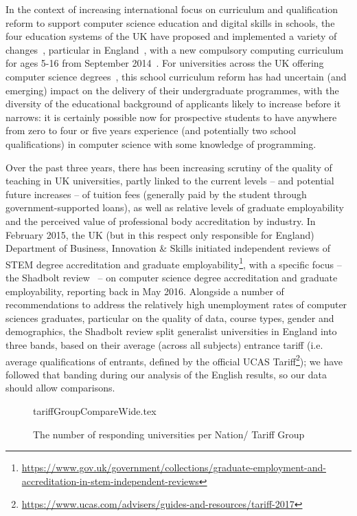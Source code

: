 \documentclass[english,submission]{programming}
\begin{document}
In the context of increasing international focus on curriculum and
qualification reform to support computer science education and digital
skills in schools, the four education systems of the UK have proposed
and implemented a variety of
changes~\cite{rs:2012,brown-et-al-sigcse2013,crick+moller-wipsce2015},
particular in England~\cite{brown-et-al-toce2014}, with a new
compulsory computing curriculum for ages 5-16 from September
2014~\cite{dfecomp:2013}. For universities across the UK offering
computer science degrees~\cite{qaacomp:2016}, this school curriculum
reform has had uncertain (and emerging) impact on the delivery of
their undergraduate programmes, with the diversity of the educational
background of applicants likely to increase before it narrows: it is
certainly possible now for prospective students to have anywhere from
zero to four or five years experience (and potentially two school
qualifications) in computer science with some knowledge of
programming.

Over the past three years, there has been increasing scrutiny of the
quality of teaching in UK universities, partly linked to the current
levels -- and potential future increases -- of tuition fees (generally
paid by the student through government-supported loans), as well as
relative levels of graduate employability and the perceived value of
professional body accreditation by industry. In February 2015, the UK
(but in this respect only responsible for England) Department of
Business, Innovation \& Skills initiated independent reviews of STEM
degree accreditation and graduate
employability\footnote{\url{https://www.gov.uk/government/collections/graduate-employment-and-accreditation-in-stem-independent-reviews}},
with a specific focus -- the Shadbolt review~\cite{shadbolt:2016} --
on computer science degree accreditation and graduate employability,
reporting back in May 2016. Alongside a number of recommendations to
address the relatively high unemployment rates of computer sciences
graduates, particular on the quality of data, course types, gender and
demographics, the Shadbolt review split generalist universities in
England into three bands, based on their average (across all subjects)
entrance tariff (i.e. average qualifications of entrants, defined by the
official UCAS
Tariff\footnote{\url{https://www.ucas.com/advisers/guides-and-resources/tariff-2017}});
we have followed that banding during our analysis of the English
results, so our data should allow comparisons.

\begin{figure}
\begin{center}
{tariffGroupCompareWide.tex}
\caption{The number of responding universities per Nation/   
 Tariff Group\label{fig:TG}}
\end{center}
\end{figure}
\end{document}
